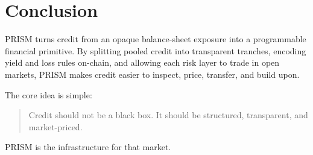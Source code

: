 \documentclass[11pt]{article}
\begin{document}
\section{Conclusion}

PRISM turns credit from an opaque balance-sheet exposure into a programmable
financial primitive. By splitting pooled credit into transparent tranches,
encoding yield and loss rules on-chain, and allowing each risk layer to trade in
open markets, PRISM makes credit easier to inspect, price, transfer, and build
upon.

The core idea is simple:

\begin{quote}
Credit should not be a black box. It should be structured, transparent, and
market-priced.
\end{quote}

PRISM is the infrastructure for that market.
\end{document}
